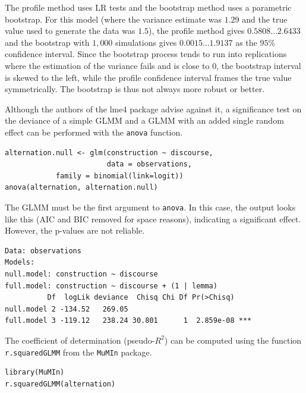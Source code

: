 \documentclass[a4paper,12pt]{article}
\begin{document}
The profile method uses LR tests and the bootstrap method uses a parametric bootstrap.
For this model (where the variance estimate was $1.29$ and the true value used to generate the data was $1.5$), the profile method gives $0.5808\dots2.6433$ and the bootstrap with $1,000$ simulations gives $0.0015\dots1.9137$ as the $95\%$ confidence interval.
Since the bootstrap process tends to run into replications where the estimation of the variance fails and is close to $0$, the bootstrap interval is skewed to the left, while the profile confidence interval frames the true value symmetrically.
The bootstrap is thus not always more robust or better.

Although the authors of the lme4 package advise against it, a significance test on the deviance of a simple GLMM and a GLMM with an added single random effect can be performed with the \texttt{anova} function.

\vspace{0.5\baselineskip}

\begin{lstlisting}[frame=trbl]
alternation.null <- glm(construction ~ discourse,
                        data = observations,
			family = binomial(link=logit))
anova(alternation, alternation.null)
\end{lstlisting}

The GLMM must be the first argument to \texttt{anova}.
In this case, the output looks like this (AIC and BIC removed for space reasons), indicating a significant effect.
However, the p-values are not reliable.

\vspace{0.5\baselineskip}

\begin{lstlisting}[frame=trbl]
Data: observations
Models:
null.model: construction ~ discourse
full.model: construction ~ discourse + (1 | lemma)
          Df  logLik deviance  Chisq Chi Df Pr(>Chisq)    
null.model 2 -134.52   269.05                             
full.model 3 -119.12   238.24 30.801      1  2.859e-08 ***
\end{lstlisting}

The coefficient of determination (pseudo-$R^2$) can be computed using the function \texttt{r.squaredGLMM} from the \texttt{MuMIn} package.

\vspace{0.5\baselineskip}

\begin{lstlisting}[frame=trbl]
library(MuMIn)
r.squaredGLMM(alternation)
\end{lstlisting}
\end{document}
